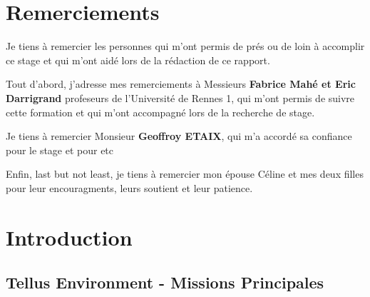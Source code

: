 \documentclass[12pt,a4paper]{report}
\newcounter{mypagecount}%
\newenvironment{interlude}{%
	\clearpage
	\setcounter{mypagecount}{\value{page}}%
	\thispagestyle{empty}%
	\pagestyle{empty}%
}{%
	\clearpage
	\setcounter{page}{\value{mypagecount}}%
}
\begin{document}
\begin{interlude}
\listoftodos
\end{interlude}


\cleardoublepage%

\chapter*{Remerciements}%
\thispagestyle{empty}%


Je tiens à remercier les personnes qui m'ont permis de prés ou de loin à accomplir ce stage et qui m'ont aidé lors de la rédaction de ce rapport.

Tout d'abord, j'adresse mes remerciements à Messieurs \textbf{Fabrice Mahé et Eric Darrigrand} profeseurs de l'Université de Rennes 1, qui m'ont permis de suivre cette formation et qui m'ont accompagné lors de la recherche de stage.

Je tiens à remercier Monsieur \textbf{Geoffroy ETAIX}, qui m'a accordé sa confiance pour le stage et pour etc 

Enfin, last but not least, je tiens à remercier mon épouse Céline et mes deux filles pour leur encouragments, leurs soutient et leur patience.



\setcounter{tocdepth}{5}
\tableofcontents
\newpage

\chapter{Introduction}
	\section{Tellus Environment - Missions Principales}
	
\end{document}
